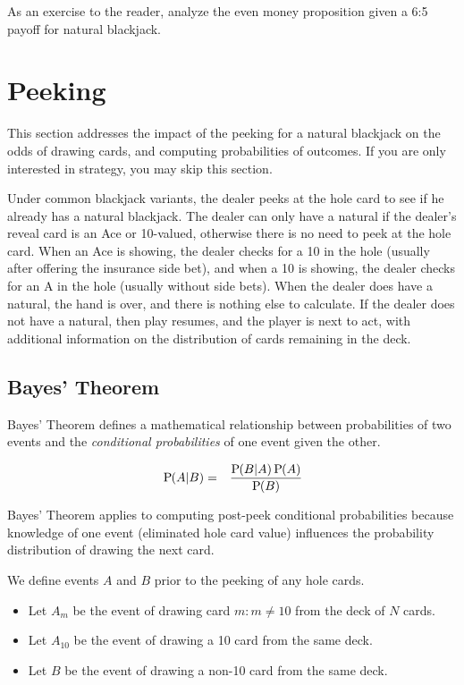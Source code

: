 As an exercise to the reader, analyze the even money proposition
given a 6:5 payoff for natural blackjack.

\section{Peeking}
\label{sec:basic:peeking}

This section addresses the impact of the peeking for a natural blackjack
on the odds of drawing cards, and computing probabilities of outcomes.
If you are only interested in strategy, you may skip this section.  

Under common blackjack variants, the dealer peeks at the hole card
to see if he already has a natural blackjack.
The dealer can only have a natural if the dealer's reveal card is an 
Ace or 10-valued, otherwise there is no need to peek at the hole card.
When an Ace is showing, the dealer checks for a 10 in the hole (usually 
after offering the insurance side bet), and when a 10 is showing, 
the dealer checks for an A in the hole (usually without side bets).
When the dealer does have a natural, the hand is over, 
and there is nothing else to calculate.
If the dealer does not have a natural, then play resumes, 
and the player is next to act, with additional information on the
distribution of cards remaining in the deck.

\subsection{Bayes' Theorem}
\label{sec:basic:peeking:bayes}

Bayes' Theorem defines a mathematical relationship between
probabilities of two events and the \emph{conditional probabilities}
of one event given the other.

\begin{eqnarray}
\textrm{P}\hspace{-.5ex}\left(A|B\right) &=& \frac{\textrm{P}\hspace{-.5ex}\left(B|A\right)\textrm{P}\hspace{-.5ex}\left(A\right)}{\textrm{P}\hspace{-.5ex}\left(B\right)} \label{eqn:bayes}
\end{eqnarray}

Bayes' Theorem applies to computing post-peek conditional probabilities
because knowledge of one event (eliminated hole card value)
influences the probability distribution of drawing the next card.

We define events $A$ and $B$ prior to the peeking of any hole cards.
\begin{itemize}
\item Let $A_m$ be the event of drawing card $m:m\neq{}10$ 
from the deck of $N$ cards.
\item Let $A_{10}$ be the event of drawing a 10 card from the same deck.
\item Let $B$ be the event of drawing a non-10 card from the same deck.
\end{itemize}

